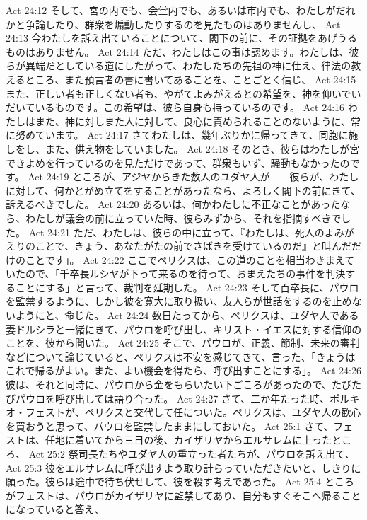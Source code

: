 Act 24:12  そして、宮の内でも、会堂内でも、あるいは市内でも、わたしがだれかと争論したり、群衆を煽動したりするのを見たものはありませんし、
Act 24:13  今わたしを訴え出ていることについて、閣下の前に、その証拠をあげうるものはありません。
Act 24:14  ただ、わたしはこの事は認めます。わたしは、彼らが異端だとしている道にしたがって、わたしたちの先祖の神に仕え、律法の教えるところ、また預言者の書に書いてあることを、ことごとく信じ、
Act 24:15  また、正しい者も正しくない者も、やがてよみがえるとの希望を、神を仰いでいだいているものです。この希望は、彼ら自身も持っているのです。
Act 24:16  わたしはまた、神に対しまた人に対して、良心に責められることのないように、常に努めています。
Act 24:17  さてわたしは、幾年ぶりかに帰ってきて、同胞に施しをし、また、供え物をしていました。
Act 24:18  そのとき、彼らはわたしが宮できよめを行っているのを見ただけであって、群衆もいず、騒動もなかったのです。
Act 24:19  ところが、アジヤからきた数人のユダヤ人が――彼らが、わたしに対して、何かとがめ立てをすることがあったなら、よろしく閣下の前にきて、訴えるべきでした。
Act 24:20  あるいは、何かわたしに不正なことがあったなら、わたしが議会の前に立っていた時、彼らみずから、それを指摘すべきでした。
Act 24:21  ただ、わたしは、彼らの中に立って、『わたしは、死人のよみがえりのことで、きょう、あなたがたの前でさばきを受けているのだ』と叫んだだけのことです」。
Act 24:22  ここでペリクスは、この道のことを相当わきまえていたので、「千卒長ルシヤが下って来るのを待って、おまえたちの事件を判決することにする」と言って、裁判を延期した。
Act 24:23  そして百卒長に、パウロを監禁するように、しかし彼を寛大に取り扱い、友人らが世話をするのを止めないようにと、命じた。
Act 24:24  数日たってから、ペリクスは、ユダヤ人である妻ドルシラと一緒にきて、パウロを呼び出し、キリスト・イエスに対する信仰のことを、彼から聞いた。
Act 24:25  そこで、パウロが、正義、節制、未来の審判などについて論じていると、ペリクスは不安を感じてきて、言った、「きょうはこれで帰るがよい。また、よい機会を得たら、呼び出すことにする」。
Act 24:26  彼は、それと同時に、パウロから金をもらいたい下ごころがあったので、たびたびパウロを呼び出しては語り合った。
Act 24:27  さて、二か年たった時、ポルキオ・フェストが、ペリクスと交代して任についた。ペリクスは、ユダヤ人の歓心を買おうと思って、パウロを監禁したままにしておいた。
Act 25:1  さて、フェストは、任地に着いてから三日の後、カイザリヤからエルサレムに上ったところ、
Act 25:2  祭司長たちやユダヤ人の重立った者たちが、パウロを訴え出て、
Act 25:3  彼をエルサレムに呼び出すよう取り計らっていただきたいと、しきりに願った。彼らは途中で待ち伏せして、彼を殺す考えであった。
Act 25:4  ところがフェストは、パウロがカイザリヤに監禁してあり、自分もすぐそこへ帰ることになっていると答え、
